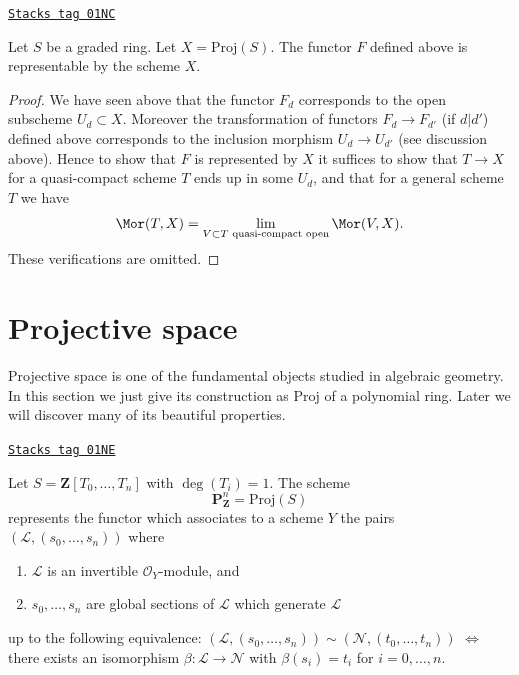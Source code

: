 \begin{lemma}
\label{constructions-lemma-proj-functor}
\href{https://stacks.math.columbia.edu/tag/01NC}{\texttt{Stacks tag 01NC}}

Let $S$ be a graded ring.
Let $X = \text{Proj}(S)$.
The functor $F$ defined above is representable by the scheme $X$.
\end{lemma}

\begin{proof}
We have seen above that the functor $F_d$ corresponds to the
open subscheme $U_d \subset X$. Moreover the transformation
of functors $F_d \to F_{d'}$ (if $d | d'$) defined above
corresponds to the inclusion morphism $U_d \to U_{d'}$
(see discussion above). Hence to show that $F$ is represented
by $X$ it suffices to show that $T \to X$ for a quasi-compact
scheme $T$ ends up in some $U_d$, and that for a general scheme
$T$ we have
$$
\Mor(T, X)
=
\lim_{V \subset T\text{ quasi-compact open}} \Mor(V, X).
$$
These verifications are omitted.
\end{proof}

\section{Projective space}
\label{constructions-section-projective-space}
Projective space is one of the fundamental objects studied in
algebraic geometry. In this section we just give its construction
as $\text{Proj}$ of a polynomial ring. Later we will discover many
of its beautiful properties.

\begin{lemma}
\label{constructions-lemma-projective-space}
\href{https://stacks.math.columbia.edu/tag/01NE}{\texttt{Stacks tag 01NE}}

Let $S = \mathbf{Z}[T_0, \ldots, T_n]$ with $\deg(T_i) = 1$.
The scheme
$$
\mathbf{P}^n_{\mathbf{Z}} = \text{Proj}(S)
$$
represents the functor which associates to a scheme $Y$ the pairs
$(\mathcal{L}, (s_0, \ldots, s_n))$ where
\begin{enumerate}
\item $\mathcal{L}$ is an invertible $\mathcal{O}_Y$-module, and
\item $s_0, \ldots, s_n$ are global sections of $\mathcal{L}$
which generate $\mathcal{L}$
\end{enumerate}
up to the following equivalence:
$(\mathcal{L}, (s_0, \ldots, s_n)) \sim
(\mathcal{N}, (t_0, \ldots, t_n))$ $\Leftrightarrow$ there exists
an isomorphism $\beta : \mathcal{L} \to \mathcal{N}$
with $\beta(s_i) = t_i$ for $i = 0, \ldots, n$.
\end{lemma}

